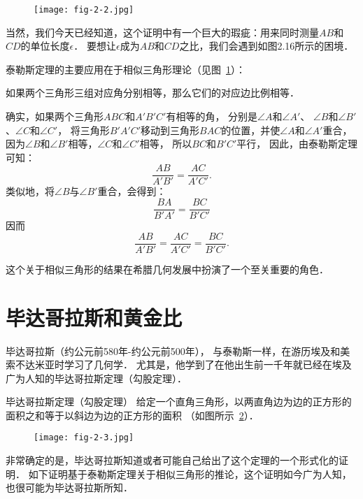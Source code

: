 \documentclass[cn,fancy,blue,11pt]{elegantbook}
\begin{document}
\begin{figure}[htbp]
	\centering
	\texttt{[image: fig-2-2.jpg]}
	\caption{\label{fig:2-2}}
\end{figure}

当然，我们今天已经知道，这个证明中有一个巨大的瑕疵：用来同时测量$AB$和$CD$的单位长度$\epsilon$．
要想让$\epsilon$成为$AB$和$CD$之比，我们会遇到如图2.16所示的困境．

泰勒斯定理的主要应用在于相似三角形理论（见图~\ref{fig:2-2}）：

\begin{corollary*}{}{}
	如果两个三角形三组对应角分别相等，那么它们的对应边比例相等．
\end{corollary*}

确实，如果两个三角形$ABC$和$A'B'C'$有相等的角，
分别是$\angle A$和$\angle A'$、
$\angle B$和$\angle B'$、$\angle C$和$\angle C'$，
将三角形$B'A'C'$移动到三角形$BAC$的位置，并使$\angle A$和$\angle A'$重合，
因为$\angle B$和$\angle B'$相等，$\angle C$和$\angle C'$相等，
所以$BC$和$B'C'$平行，
因此，由泰勒斯定理可知：
\[\frac{AB}{A'B'}=\frac{AC}{A'C'}.\]
类似地，将$\angle B$与$\angle B'$重合，会得到：
\[\frac{BA}{B'A'}=\frac{BC}{B'C'}\]
因而
\[\frac{AB}{A'B'}=\frac{AC}{A'C'}=\frac{BC}{B'C'}.\]

这个关于相似三角形的结果在希腊几何发展中扮演了一个至关重要的角色．

\section{毕达哥拉斯和黄金比}

毕达哥拉斯（约公元前580年-约公元前500年），
与泰勒斯一样，在游历埃及和美索不达米亚时学习了几何学．
尤其是，他学到了在他出生前一千年就已经在埃及广为人知的毕达哥拉斯定理（勾股定理）．

\begin{theorem*}{毕达哥拉斯定理（勾股定理）}{}
	给定一个直角三角形，以两直角边为边的正方形的面积之和等于以斜边为边的正方形的面积
	（如图所示~\ref{fig:2-3}）．
\end{theorem*}

\begin{figure}[htbp]
	\centering
	\texttt{[image: fig-2-3.jpg]}
	\caption{\label{fig:2-3}}
\end{figure}

非常确定的是，毕达哥拉斯知道或者可能自己给出了这个定理的一个形式化的证明．
如下证明基于泰勒斯定理关于相似三角形的推论，这个证明如今广为人知，也很可能为毕达哥拉斯所知．
\end{document}
